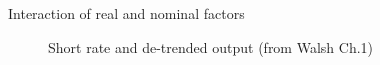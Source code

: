 

\begin{frame}{Interaction of real and nominal factors}

\begin{figure}[!htb]
\caption{\label{fig:walsh_ch2_M_GDP} Short rate and de-trended output (from Walsh Ch.1)}
\end{figure}
 
\end{frame}



